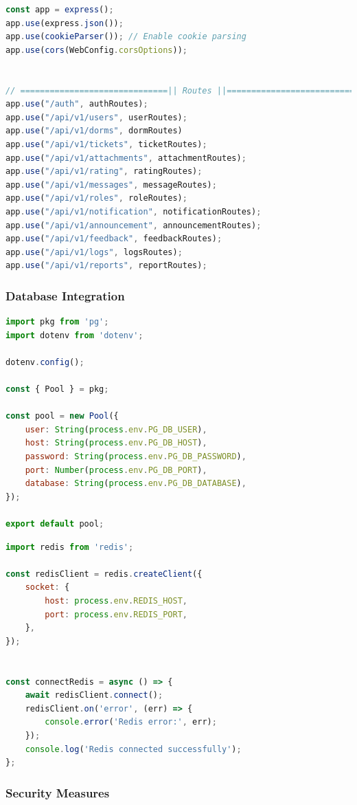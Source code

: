 \begin{lstlisting}[language=Javascript, breaklines=true, caption=ExpressJS Server Setup]
const app = express();
app.use(express.json());
app.use(cookieParser()); // Enable cookie parsing
app.use(cors(WebConfig.corsOptions));


// ==============================|| Routes ||============================== //
app.use("/auth", authRoutes);                     
app.use("/api/v1/users", userRoutes);                  
app.use("/api/v1/dorms", dormRoutes)
app.use("/api/v1/tickets", ticketRoutes);        
app.use("/api/v1/attachments", attachmentRoutes); 
app.use("/api/v1/rating", ratingRoutes);          
app.use("/api/v1/messages", messageRoutes);
app.use("/api/v1/roles", roleRoutes);       
app.use("/api/v1/notification", notificationRoutes); 
app.use("/api/v1/announcement", announcementRoutes);        
app.use("/api/v1/feedback", feedbackRoutes);       
app.use("/api/v1/logs", logsRoutes);     
app.use("/api/v1/reports", reportRoutes);
\end{lstlisting}	

	\subsubsection{Database Integration}
	
\begin{lstlisting}[language=Javascript, breaklines=true, caption=Server connects to PostgreSQL Database]
import pkg from 'pg';
import dotenv from 'dotenv';

dotenv.config();

const { Pool } = pkg;

const pool = new Pool({
	user: String(process.env.PG_DB_USER),
	host: String(process.env.PG_DB_HOST),
	password: String(process.env.PG_DB_PASSWORD),
	port: Number(process.env.PG_DB_PORT),
	database: String(process.env.PG_DB_DATABASE),
});

export default pool;  
\end{lstlisting}	


\begin{lstlisting}[language=Javascript, breaklines=true, caption=Server connects to Redis]
import redis from 'redis';

const redisClient = redis.createClient({
	socket: {
		host: process.env.REDIS_HOST,
		port: process.env.REDIS_PORT,
	},
});


const connectRedis = async () => {
	await redisClient.connect();
	redisClient.on('error', (err) => {
		console.error('Redis error:', err);
	});
	console.log('Redis connected successfully');
};
\end{lstlisting}	


\subsubsection{Security Measures}


	
	
	